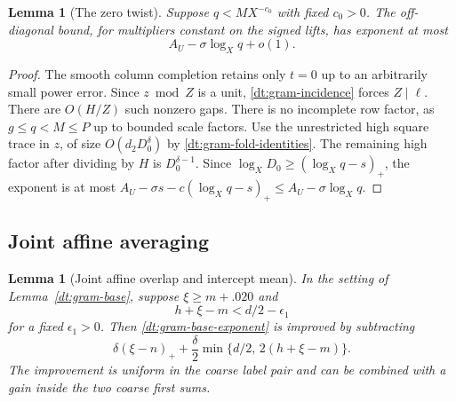 \documentclass[11pt,a4paper]{article}
\theoremstyle{paperplain}
\newtheorem{lemma}[theorem]{Lemma}
\numberwithin{equation}{section}
\begin{document}
\begin{lemma}[The zero twist]\label{dt:gram-middle}
Suppose \(q<MX^{-c_0}\) with fixed \(c_0>0\). The
off-diagonal bound, for multipliers constant on the signed
lifts, has exponent at most
\begin{equation}
                A_U-\sigma\log_X q+o(1).
 \label{dt:gram-zero-exponent}
\end{equation}
\end{lemma}

\begin{proof}
The smooth column completion retains only \(t=0\) up to
an arbitrarily small power error. Since \(z\bmod Z\) is
a unit, \eqref{dt:gram-incidence} forces \(Z\mid\ell\).
There are \(O(H/Z)\) such nonzero gaps. There is no incomplete
row factor, as \(g\le q<M\le P\) up to bounded scale factors.
Use the unrestricted high square trace in \(z\), of size
\(O(d_2D_0^\delta)\) by \eqref{dt:gram-fold-identities}.
The remaining high factor after dividing by \(H\) is
\(D_0^{\delta-1}\). Since \(\log_XD_0\ge(\log_Xq-s)_+\),
the exponent is at most
\(A_U-\sigma s-c(\log_Xq-s)_+\le A_U-\sigma\log_Xq\).
\end{proof}

\subsection{Joint affine averaging}

\begin{lemma}[Joint affine overlap and intercept mean]\label{dt:gram-joint}
In the setting of Lemma~\ref{dt:gram-base}, suppose
\(\xi\ge m+.020\) and
\begin{equation}
                 h+\xi-m<d/2-\epsilon_1
 \label{dt:gram-joint-fit}
\end{equation}
for a fixed \(\epsilon_1>0\). Then
\eqref{dt:gram-base-exponent} is improved by subtracting
\begin{equation}
         \delta(\xi-n)_+
             +\frac{\delta}{2}\min\{d/2,\,2(h+\xi-m)\}.
 \label{dt:gram-joint-gain}
\end{equation}
The improvement is uniform in the coarse label pair and
can be combined with a gain inside the two coarse first sums.
\end{lemma}
\end{document}
